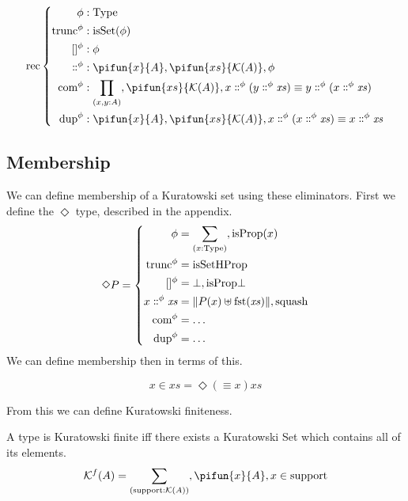 \begin{equation} \label{kuratowski-rec}
  \text{rec} \left\{ \begin{aligned}
    \phi &: \text{Type} \\
    \text{trunc}^\phi &: \text{isSet}(\phi) \\
    []^\phi &: \phi \\
    \dblcolon^\phi &: \pifun{x}{A} , \pifun{xs}{\mathcal{K}(A)} , \phi \\
    \text{com}^\phi &: \prod_{(x , y : A)} , \pifun{xs}{\mathcal{K}(A)} , x \dblcolon^\phi (y \dblcolon^\phi \mathit{xs}) \equiv y \dblcolon^\phi (x \dblcolon^\phi \mathit{xs}) \\
    \text{dup}^\phi &: \pifun{x}{A} , \pifun{xs}{\mathcal{K}(A)} , x \dblcolon^\phi (x \dblcolon^\phi \mathit{xs}) \equiv x \dblcolon^\phi \mathit{xs}
  \end{aligned} \right.
\end{equation}


\subsection{Membership}
We can define membership of a Kuratowski set using these eliminators.
First we define the \(\Diamond\) type, described in the appendix.
\begin{equation}
  \Diamond P = \left\{ \begin{aligned}
    \phi &= \sum_{(x : \text{Type})} , \text{isProp}(x) \\
    \text{trunc}^\phi &= \text{isSetHProp} \\
    []^\phi &= \bot , \text{isProp}\bot \\
    x \dblcolon^\phi \mathit{xs} &= \lVert P(x) \uplus \text{fst}(\mathit{xs}) \rVert , \text{squash} \\
    \text{com}^\phi &= \dots \\
    \text{dup}^\phi &= \dots
  \end{aligned} \right.
\end{equation}
We can define membership then in terms of this.
\begin{definition}
  \begin{equation}
    x \in \mathit{xs} = \Diamond (\equiv x) \mathit{xs}
  \end{equation}
\end{definition}

From this we can define Kuratowski finiteness.
\begin{definition}
  A type is Kuratowski finite iff there exists a Kuratowski Set which contains
  all of its elements.
  \begin{equation}
    \mathcal{K}^{f}(A) = \sum_{(\text{support} : \mathcal{K}(A))} , \pifun{x}{A} , x \in \text{support}
  \end{equation}
\end{definition}

